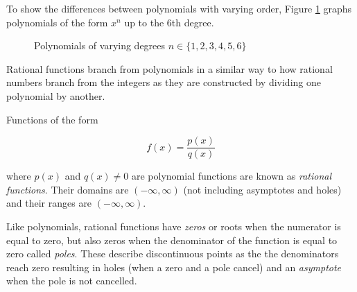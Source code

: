 \begin{example} To show the differences between polynomials with varying order, Figure \ref{fig:polynomials} graphs polynomials of the form $x^n$ up to the $6$th degree.

    \begin{figure}[!ht]
        \centering
        \caption{Polynomials of varying degrees $n \in \{1,2,3,4,5,6\}$}
        \label{fig:polynomials}
    \end{figure}
\end{example}

Rational functions branch from polynomials in a similar way to how rational numbers branch from the integers as they are constructed by dividing one polynomial by another.

\begin{definition}
    Functions of the form

    \begin{equation}
        f(x) = \frac{p(x)}{q(x)}
    \end{equation}

    \noindent where $p(x)$ and $q(x) \neq 0$ are polynomial functions are known as \textit{rational functions}. Their domains are $(-\infty,\infty)$ (not including asymptotes and holes) and their ranges are $(-\infty,\infty)$.
\end{definition}

Like polynomials, rational functions have \textit{zeros} or roots when the numerator is equal to zero, but also zeros when the denominator of the function is equal to zero called \textit{poles}. These describe discontinuous points as the the denominators reach zero resulting in holes (when a zero and a pole cancel) and an \textit{asymptote} when the pole is not cancelled.

